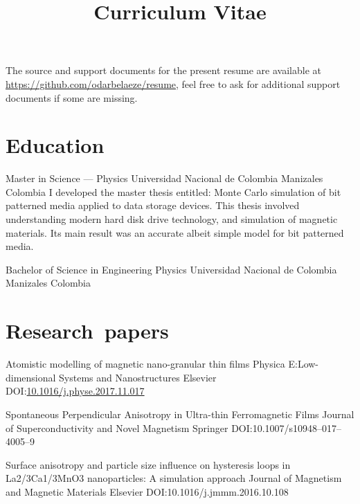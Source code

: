 \documentclass[12pt,english]{moderncv}
\title{Curriculum Vitae}
\begin{document}
\maketitle

\begin{centering}
    The source and support documents for the present resume are available at
    \url{https://github.com/odarbelaeze/resume}, feel free to ask for
    additional support documents if some are missing.
\end{centering}


\section{Education}

        {Master in Science --- Physics}
        {Universidad Nacional de Colombia}
        {Manizales}
        {Colombia}
        {%
            I developed the master thesis entitled: Monte Carlo simulation of
            bit patterned media applied to data storage devices. This thesis
            involved understanding modern hard disk drive technology, and
            simulation of magnetic materials. Its main result was an accurate
            albeit simple model for bit patterned media.
        }

        {Bachelor of Science in Engineering Physics}
        {Universidad Nacional de Colombia}
        {Manizales}
        {Colombia}
        {}


\section{Research~papers}

        {Atomistic modelling of magnetic nano-granular thin films}
        {Physica E:\@ Low-dimensional Systems and Nanostructures}
        {Elsevier}
        {}
        {DOI:\@ \href{https://doi.org/10.1016/j.physe.2017.11.017}{10.1016/j.physe.2017.11.017}}

        {%
            Spontaneous Perpendicular Anisotropy in Ultra-thin Ferromagnetic
            Films%
        }
        {Journal of Superconductivity and Novel Magnetism}
        {Springer}
        {}
        {DOI:\@ 10.1007/s10948--017--4005--9}

        {%
            Surface anisotropy and particle size influence on hysteresis loops
            in La2/3Ca1/3MnO3 nanoparticles: A simulation approach%
        }
        {Journal of Magnetism and Magnetic Materials}
        {Elsevier}
        {}
        {DOI:\@ 10.1016/j.jmmm.2016.10.108}
\end{document}
